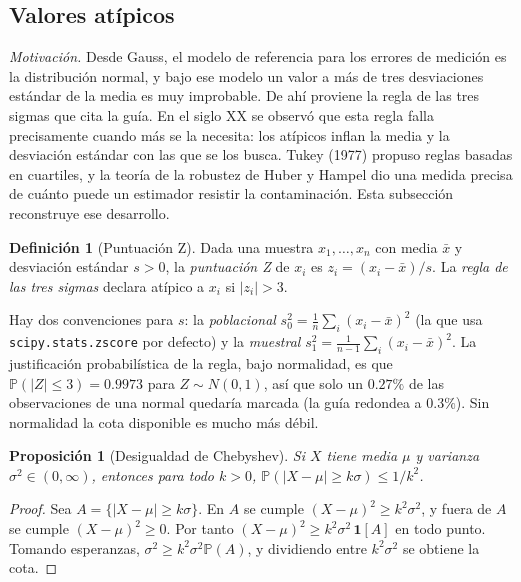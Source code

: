 \documentclass[11pt]{article}
\newtheorem{proposicion}[teorema]{Proposición}
\theoremstyle{definition}
\newtheorem{definicion}[teorema]{Definición}
\theoremstyle{remark}
\newcommand{\Prob}{\mathbb{P}}
\newcommand{\ind}[1]{\mathbf{1}\!\left[#1\right]}
\newcommand{\abs}[1]{\left\lvert #1\right\rvert}
\begin{document}
\subsection{Valores atípicos}\label{sec:atipicos}

\noindent \emph{Motivación.} Desde Gauss, el modelo de referencia para los errores de medición es la distribución normal, y bajo ese modelo un valor a más de tres desviaciones estándar de la media es muy improbable. De ahí proviene la regla de las tres sigmas que cita la guía. En el siglo XX se observó que esta regla falla precisamente cuando más se la necesita: los atípicos inflan la media y la desviación estándar con las que se los busca. Tukey (1977) propuso reglas basadas en cuartiles, y la teoría de la robustez de Huber y Hampel dio una medida precisa de cuánto puede un estimador resistir la contaminación. Esta subsección reconstruye ese desarrollo.

\begin{definicion}[Puntuación Z]\label{def:z}
\noindent Dada una muestra $x_1,\dots,x_n$ con media $\bar x$ y desviación estándar $s>0$, la \emph{puntuación Z} de $x_i$ es $z_i=(x_i-\bar x)/s$. La \emph{regla de las tres sigmas} declara atípico a $x_i$ si $\abs{z_i}>3$.
\end{definicion}

\noindent Hay dos convenciones para $s$: la \emph{poblacional} $s_0^2=\frac1n\sum_i(x_i-\bar x)^2$ (la que usa \texttt{scipy.stats.zscore} por defecto) y la \emph{muestral} $s_1^2=\frac1{n-1}\sum_i(x_i-\bar x)^2$. La justificación probabilística de la regla, bajo normalidad, es que $\Prob(\abs{Z}\le3)=0.9973$ para $Z\sim N(0,1)$, así que solo un $0.27\%$ de las observaciones de una normal quedaría marcada (la guía redondea a $0.3\%$). Sin normalidad la cota disponible es mucho más débil.

\begin{proposicion}[Desigualdad de Chebyshev]\label{prop:chebyshev}
\noindent Si $X$ tiene media $\mu$ y varianza $\sigma^2\in(0,\infty)$, entonces para todo $k>0$, $\Prob(\abs{X-\mu}\ge k\sigma)\le 1/k^2$.
\end{proposicion}
\begin{proof}
\noindent Sea $A=\{\abs{X-\mu}\ge k\sigma\}$. En $A$ se cumple $(X-\mu)^2\ge k^2\sigma^2$, y fuera de $A$ se cumple $(X-\mu)^2\ge0$. Por tanto $(X-\mu)^2\ge k^2\sigma^2\,\ind{A}$ en todo punto. Tomando esperanzas, $\sigma^2\ge k^2\sigma^2\Prob(A)$, y dividiendo entre $k^2\sigma^2$ se obtiene la cota.
\end{proof}
\end{document}
